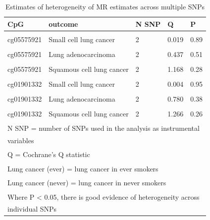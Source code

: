 \documentclass[11pt,oneside]{bristolthesis}
\begin{document}
\begin{table}[!h]

\caption{\label{tab:sup-tab6-07}Estimates of heterogeneity of MR estimates across multiple SNPs}
\centering
\begin{tabular}[t]{lllll}
\toprule
CpG & outcome & N SNP & Q & P\\
\midrule
\cellcolor{gray!6}{cg05575921} & \cellcolor{gray!6}{Lung cancer (ever)} & \cellcolor{gray!6}{2} & \cellcolor{gray!6}{1.838} & \cellcolor{gray!6}{0.17}\\
cg05575921 & Small cell lung cancer & 2 & 0.019 & 0.89\\
\cellcolor{gray!6}{cg05575921} & \cellcolor{gray!6}{Lung cancer (never)} & \cellcolor{gray!6}{2} & \cellcolor{gray!6}{1.424} & \cellcolor{gray!6}{0.23}\\
cg05575921 & Lung adenocarcinoma & 2 & 0.437 & 0.51\\
\cellcolor{gray!6}{cg05575921} & \cellcolor{gray!6}{Lung cancer} & \cellcolor{gray!6}{2} & \cellcolor{gray!6}{0.003} & \cellcolor{gray!6}{0.96}\\
\addlinespace
cg05575921 & Squamous cell lung cancer & 2 & 1.168 & 0.28\\
\cellcolor{gray!6}{cg01901332} & \cellcolor{gray!6}{Lung cancer (ever)} & \cellcolor{gray!6}{2} & \cellcolor{gray!6}{0.085} & \cellcolor{gray!6}{0.77}\\
cg01901332 & Small cell lung cancer & 2 & 0.004 & 0.95\\
\cellcolor{gray!6}{cg01901332} & \cellcolor{gray!6}{Lung cancer (never)} & \cellcolor{gray!6}{2} & \cellcolor{gray!6}{0.321} & \cellcolor{gray!6}{0.57}\\
cg01901332 & Lung adenocarcinoma & 2 & 0.780 & 0.38\\
\addlinespace
\cellcolor{gray!6}{cg01901332} & \cellcolor{gray!6}{Lung cancer} & \cellcolor{gray!6}{2} & \cellcolor{gray!6}{0.965} & \cellcolor{gray!6}{0.33}\\
cg01901332 & Squamous cell lung cancer & 2 & 1.266 & 0.26\\
\bottomrule
\multicolumn{5}{l}{\textsuperscript{} N SNP = number of SNPs used in the analysis as instrumental}\\
\multicolumn{5}{l}{variables}\\
\multicolumn{5}{l}{\textsuperscript{} Q = Cochrane’s Q statistic}\\
\multicolumn{5}{l}{\textsuperscript{} Lung cancer (ever) = lung cancer in ever smokers}\\
\multicolumn{5}{l}{\textsuperscript{} Lung cancer (never) = lung cancer in never smokers}\\
\multicolumn{5}{l}{\textsuperscript{} Where P < 0.05, there is good evidence of heterogeneity across}\\
\multicolumn{5}{l}{individual SNPs}\\
\end{tabular}
\end{table}
\pagebreak
\end{document}
